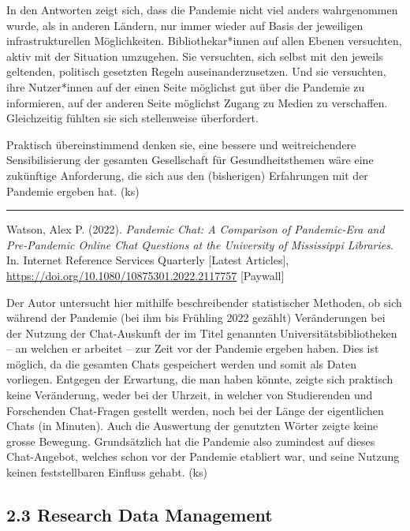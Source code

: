 \documentclass[a4paper,
fontsize=11pt,
oneside,
numbers=noperiodatend,
parskip=half-,
bibliography=totoc,
final
]{scrartcl}
\begin{document}
In den Antworten zeigt sich, dass die Pandemie nicht viel anders
wahrgenommen wurde, als in anderen Ländern, nur immer wieder auf Basis
der jeweiligen infrastrukturellen Möglichkeiten. Bibliothekar*innen auf
allen Ebenen versuchten, aktiv mit der Situation umzugehen. Sie
versuchten, sich selbst mit den jeweils geltenden, politisch gesetzten
Regeln auseinanderzusetzen. Und sie versuchten, ihre Nutzer*innen auf
der einen Seite möglichst gut über die Pandemie zu informieren, auf der
anderen Seite möglichst Zugang zu Medien zu verschaffen. Gleichzeitig
fühlten sie sich stellenweise überfordert.

Praktisch übereinstimmend denken sie, eine bessere und weitreichendere
Sensibilisierung der gesamten Gesellschaft für Gesundheitsthemen wäre
eine zukünftige Anforderung, die sich aus den (bisherigen) Erfahrungen
mit der Pandemie ergeben hat. (ks)

\begin{center}\rule{0.5\linewidth}{0.5pt}\end{center}

Watson, Alex P. (2022). \emph{Pandemic Chat: A Comparison of
Pandemic-Era and Pre-Pandemic Online Chat Questions at the University of
Mississippi Libraries}. In. Internet Reference Services Quarterly
{[}Latest Articles{]},
\url{https://doi.org/10.1080/10875301.2022.2117757} {[}Paywall{]}

Der Autor untersucht hier mithilfe beschreibender statistischer
Methoden, ob sich während der Pandemie (bei ihm bis Frühling 2022
gezählt) Veränderungen bei der Nutzung der Chat-Auskunft der im Titel
genannten Universitätsbibliotheken -- an welchen er arbeitet -- zur Zeit
vor der Pandemie ergeben haben. Dies ist möglich, da die gesamten Chats
gespeichert werden und somit als Daten vorliegen. Entgegen der
Erwartung, die man haben könnte, zeigte sich praktisch keine
Veränderung, weder bei der Uhrzeit, in welcher von Studierenden und
Forschenden Chat-Fragen gestellt werden, noch bei der Länge der
eigentlichen Chats (in Minuten). Auch die Auswertung der genutzten
Wörter zeigte keine grosse Bewegung. Grundsätzlich hat die Pandemie also
zumindest auf dieses Chat-Angebot, welches schon vor der Pandemie
etabliert war, und seine Nutzung keinen feststellbaren Einfluss gehabt.
(ks)

\pagebreak

\hypertarget{research-data-management}{%
\subsection{2.3 Research Data
Management}\label{research-data-management}}
\end{document}
